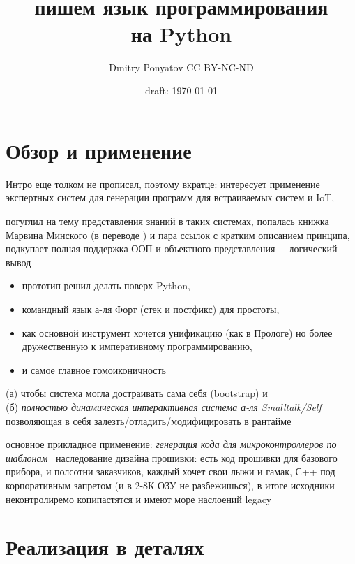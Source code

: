 

\author{Dmitry Ponyatov  CC BY-NC-ND}
\title{{\Huge \ \\\hico}\\пишем язык программирования\\на Python}
\date{draft: \today}



\maketitle
\tableofcontents



\part{Обзор и применение \hico}

Интро еще толком не прописал, поэтому вкратце:
интересует применение экспертных систем для генерации программ для встраиваемых
систем и IoT,

погуглил на тему представления знаний в таких системах, попалась
книжка Марвина Минского (в переводе \cite{minsky}) и пара ссылок с кратким
описанием принципа, подкупает полная поддержка ООП и объектного представления + логический вывод
\begin{itemize}[nosep]
  \item 
прототип решил делать поверх Python,
  \item 
командный язык а-ля Форт (стек и постфикс) для простоты,
  \item 
как основной инструмент хочется унификацию (как в Прологе) но более
дружественную к императивному программированию,
\clearpage
  \item 
и самое главное гомоиконичность\\
\end{itemize}
(а) чтобы система могла достраивать сама себя (bootstrap) и\\ 
(б) \emph{полностью динамическая интерактивная система а-ля Smalltalk/Self}\\
позволяющая в себя залезть/отладить/модифицировать в рантайме

\bigskip
\noindent
основное прикладное применение: \emph{генерация кода для микроконтроллеров по
шаблонам}\ 
наследование дизайна прошивки: есть код прошивки для базового прибора, и
полсотни заказчиков, каждый хочет свои лыжи и гамак, С++ под корпоративным
запретом (и в 2-8К ОЗУ не разбежишься), в итоге исходники неконтролиремо
копипастятся и имеют море наслоений legacy


\part{Реализация в деталях}\secdown






\secup




